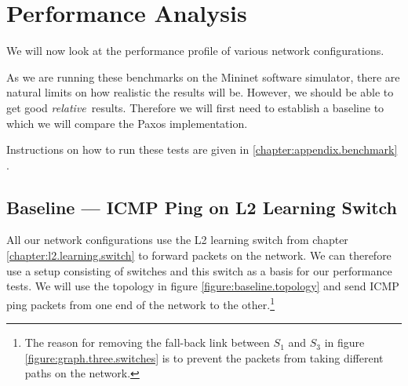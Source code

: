 \chapter{Performance Analysis}
\label{chapter:analysis}

We will now look at the performance profile of various network
configurations.

As we are running these benchmarks on the Mininet software simulator, there
are natural limits on how realistic the results will be.  However, we should
be able to get good \textit{relative} results.   Therefore we will first
need to establish a baseline to which we will compare the
Paxos implementation.

Instructions on how to run these tests are given in
\ref{chapter:appendix.benchmark} .

\section{Baseline --- ICMP Ping on L2 Learning Switch}
\label{chapter:baseline.benchmark}

All our network configurations use the L2 learning switch from chapter
\ref{chapter:l2.learning.switch} to forward packets on the network.  We can
therefore use a setup consisting of switches and this switch as a basis for
our performance tests.  We will use the topology in figure
\ref{figure:baseline.topology} and send \ac{ICMP} ping packets from one end of
the network to the other.\footnote{
The reason for removing the fall-back link between $S_1$ and $S_3$ in figure
\ref{figure:graph.three.switches} is to prevent the packets from taking
different paths on the network.}

